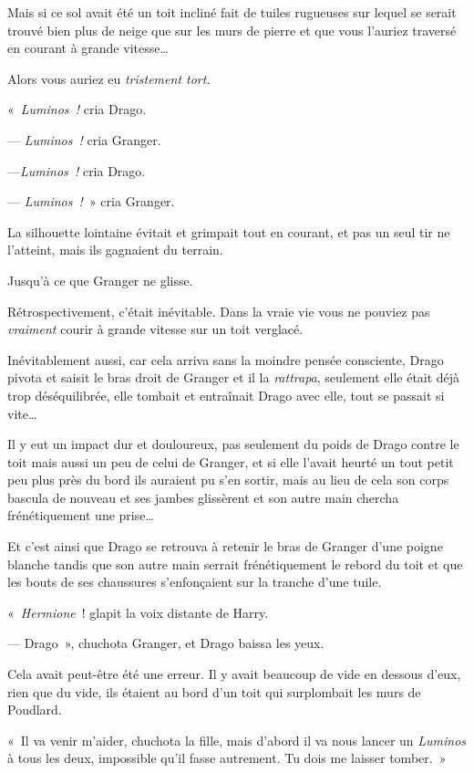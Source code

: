 Mais si ce sol avait été un toit incliné fait de tuiles rugueuses sur lequel se serait trouvé bien plus de neige que sur les murs de pierre et que vous l'auriez traversé en courant à grande vitesse…

Alors vous auriez eu \emph{tristement tort}.

«~\emph{Luminos~!} cria Drago.

--- \emph{Luminos~!} cria Granger.

---\emph{Luminos~!} cria Drago.

--- \emph{Luminos~!}~» cria Granger.

La silhouette lointaine évitait et grimpait tout en courant, et pas un seul tir ne l'atteint, mais ils gagnaient du terrain.

Jusqu'à ce que Granger ne glisse.

Rétrospectivement, c'était inévitable.
Dans la vraie vie vous ne pouviez pas \emph{vraiment} courir à grande vitesse sur un toit verglacé.

Inévitablement aussi, car cela arriva sans la moindre pensée consciente, Drago pivota et saisit le bras droit de Granger et il la \emph{rattrapa}, seulement elle était déjà trop déséquilibrée, elle tombait et entraînait Drago avec elle, tout se passait si vite…

Il y eut un impact dur et douloureux, pas seulement du poids de Drago contre le toit mais aussi un peu de celui de Granger, et si elle l'avait heurté un tout petit peu plus près du bord ils auraient pu s'en sortir, mais au lieu de cela son corps bascula de nouveau et ses jambes glissèrent et son autre main chercha frénétiquement une prise…

Et c'est ainsi que Drago se retrouva à retenir le bras de Granger d'une poigne blanche tandis que son autre main serrait frénétiquement le rebord du toit et que les bouts de ses chaussures s'enfonçaient sur la tranche d'une tuile.

«~\emph{Hermione}~! glapit la voix distante de Harry.

--- Drago~», chuchota Granger, et Drago baissa les yeux.

Cela avait peut-être été une erreur.
Il y avait beaucoup de vide en dessous d'eux, rien que du vide, ils étaient au bord d'un toit qui surplombait les murs de Poudlard.

«~Il va venir m'aider, chuchota la fille, mais d'abord il va nous lancer un \emph{Luminos} à tous les deux, impossible qu'il fasse autrement.
Tu dois me laisser tomber.~»

